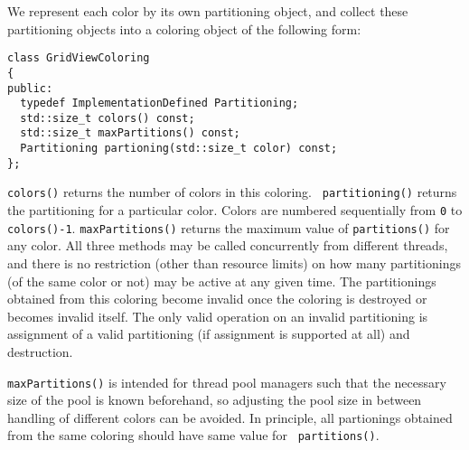 \documentclass{article}
\begin{document}
We represent each color by its own partitioning object, and collect these
partitioning objects into a coloring object of the following form:
\begin{lstlisting}
class GridViewColoring
{
public:
  typedef ImplementationDefined Partitioning;
  std::size_t colors() const;
  std::size_t maxPartitions() const;
  Partitioning partioning(std::size_t color) const;
};
\end{lstlisting}

{\tt colors()} returns the number of colors in this coloring.  {\tt
  partitioning()} returns the partitioning for a particular color.  Colors are
numbered sequentially from {\tt 0} to {\tt colors()-1}.  {\tt maxPartitions()}
returns the maximum value of {\tt partitions()} for any color.  All three
methods may be called concurrently from different threads, and there is no
restriction (other than resource limits) on how many partitionings (of the
same color or not) may be active at any given time.  The partitionings
obtained from this coloring become invalid once the coloring is destroyed or
becomes invalid itself.  The only valid operation on an invalid partitioning
is assignment of a valid partitioning (if assignment is supported at all) and
destruction.

{\tt maxPartitions()} is intended for thread pool managers such that the
necessary size of the pool is known beforehand, so adjusting the pool size in
between handling of different colors can be avoided.  In principle, all
partionings obtained from the same coloring should have same value for {\tt
  partitions()}.




\end{document}
